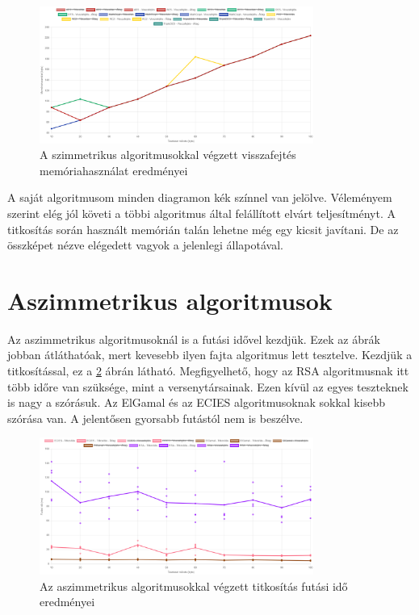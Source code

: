 \documentclass[12pt]{report} %
\begin{document}
\begin{figure}[H]
    \centering %
    \includegraphics[width=0.8\textwidth]{Figures/SymmetricDecryptionMemoryUsage.png} %
    \caption{A szimmetrikus algoritmusokkal végzett visszafejtés memóriahasználat eredményei} %
    \label{fig:SymmetricDecryptionMemoryUsage} %
\end{figure}

A saját algoritmusom minden diagramon kék színnel van jelölve. Véleményem szerint elég jól követi a többi algoritmus által felállított elvárt teljesítményt. A titkosítás során használt memórián talán lehetne még egy kicsit javítani. De az összképet nézve elégedett vagyok a jelenlegi állapotával.

\section{Aszimmetrikus algoritmusok} %

Az aszimmetrikus algoritmusoknál is a futási idővel kezdjük. Ezek az ábrák jobban átláthatóak, mert kevesebb ilyen fajta algoritmus lett tesztelve. Kezdjük a titkosítással, ez a \ref{fig:AsymmetricEncryptionRunTime} ábrán látható. Megfigyelhető, hogy az RSA algoritmusnak itt több időre van szüksége, mint a versenytársainak. Ezen kívül az egyes teszteknek is nagy a szórásuk. Az ElGamal és az ECIES algoritmusoknak sokkal kisebb szórása van. A jelentősen gyorsabb futástól nem is beszélve.

\begin{figure}[H]
    \centering %
    \includegraphics[width=0.8\textwidth]{Figures/AsymmetricEncryptionRunTime.png} %
    \caption{Az aszimmetrikus algoritmusokkal végzett titkosítás futási idő eredményei} %
    \label{fig:AsymmetricEncryptionRunTime} %
\end{figure}
\end{document}
